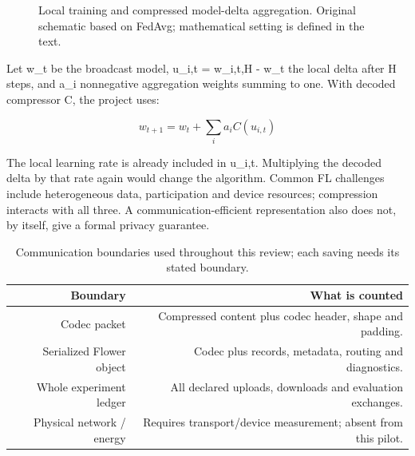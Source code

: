 \begin{figure}[htbp]\centering
{}
\caption{Local training and compressed model-delta aggregation. Original schematic based on FedAvg; mathematical setting is defined in the text.}
\label{fig:fl}
\end{figure}

Let w\_t be the broadcast model, u\_i,t = w\_i,t,H - w\_t the local delta after H steps, and a\_i nonnegative aggregation weights summing to one. With decoded compressor C, the project uses:

\begin{equation*}w_{t+1} = w_t + \sum_i a_i C(u_{i,t})\end{equation*}

The local learning rate is already included in u\_i,t. Multiplying the decoded delta by that rate again would change the algorithm. Common FL challenges include heterogeneous data, participation and device resources; compression interacts with all three. A communication-efficient representation also does not, by itself, give a formal privacy guarantee. \parencite{kairouz2021advances}

\begin{table}[htbp]
\centering
\small
\begin{tabularx}{\textwidth}{R{0.60000}R{1.40000}}
\toprule
\textbf{Boundary} & \textbf{What is counted} \\\midrule
Codec packet & Compressed content plus codec header, shape and padding. \\
Serialized Flower object & Codec plus records, metadata, routing and diagnostics. \\
Whole experiment ledger & All declared uploads, downloads and evaluation exchanges. \\
Physical network / energy & Requires transport/device measurement; absent from this pilot. \\
\bottomrule
\end{tabularx}
\caption{Communication boundaries used throughout this review; each saving needs its stated boundary.}
\label{tab:accounting}
\end{table}

